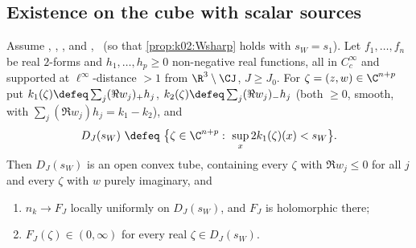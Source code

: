 \subsection{Existence on the cube with scalar sources}\label{ssec:k02:W1}

\begin{theorem}\label{thm:k02:W1}
Assume \BALint, \RENorb, \Kh, and \Itwo, \Ithree\ (so that \cref{prop:k02:Wsharp} holds with $s_W=s_1$). Let $f_1,\dots,f_n$ be real $2$-forms and $h_1,\dots,h_p\ge0$ non-negative real functions, all in $C^\infty_c$ and supported at $\ell^\infty$-distance $>1$ from $\R^3\setminus\CJ$, $J\ge J_0$. For $\zeta=(z,w)\in\C^{n+p}$ put $k_1(\zeta)\defeq\sum_j(\Re w_j)_+h_j$, $k_2(\zeta)\defeq\sum_j(\Re w_j)_-h_j$ (both $\ge0$, smooth, with $\sum_j(\Re w_j)h_j=k_1-k_2$), and
\[
D_J(s_W)\ \defeq\ \big\{\zeta\in\C^{n+p}:\ \sup_x2k_1(\zeta)(x)<s_W\big\}.
\]
Then $D_J(s_W)$ is an open convex tube, containing every $\zeta$ with $\Re w_j\le0$ for all $j$ and every $\zeta$ with $w$ purely imaginary, and
\begin{enumerate}[label=\textup{(\roman*)},leftmargin=*]
\item $n_k\to F_J$ locally uniformly on $D_J(s_W)$, and $F_J$ is holomorphic there;
\item $F_J(\zeta)\in(0,\infty)$ for every real $\zeta\in D_J(s_W)$.
\end{enumerate}
\end{theorem}

